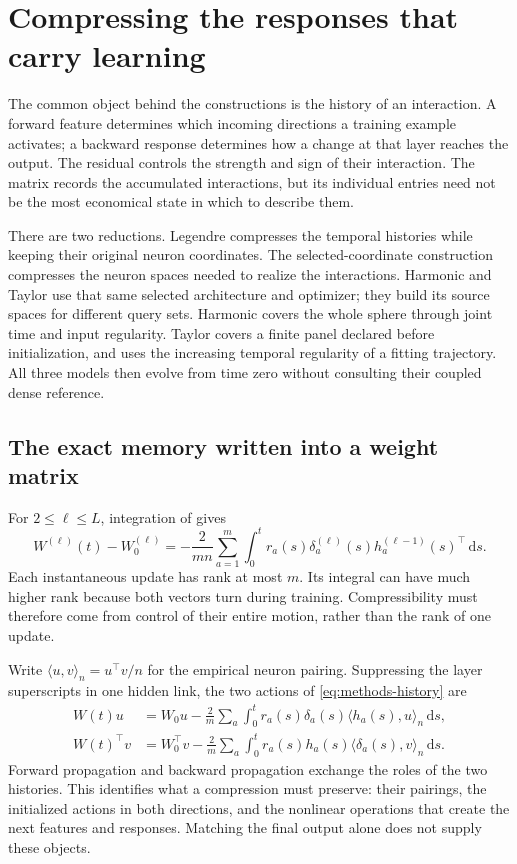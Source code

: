 \section{Compressing the responses that carry learning}
\label{sec:methods}

The common object behind the constructions is the history of an interaction.
A forward feature determines which incoming directions a training example
activates; a backward response determines how a change at that layer reaches
the output. The residual controls the strength and sign of their interaction.
The matrix records the accumulated interactions, but its individual entries
need not be the most economical state in which to describe them.

There are two reductions. Legendre compresses the temporal histories while
keeping their original neuron coordinates. The selected-coordinate
construction compresses the neuron spaces needed to realize the interactions.
Harmonic and Taylor use that same selected architecture and optimizer;
they build its source spaces for different query sets. Harmonic covers the
whole sphere through joint time and input regularity. Taylor covers a
finite panel declared before initialization, and uses the increasing temporal
regularity of a fitting trajectory. All three models then evolve from time
zero without consulting their coupled dense reference.

\subsection{The exact memory written into a weight matrix}
\label{sec:response-identity}

For $2\le\ell\le L$, integration of  gives
\begin{equation}
 W^{(\ell)}(t)-W_0^{(\ell)}=-\frac{2}{mn}\sum_{a=1}^m
 \int_0^t r_a(s)\delta_a^{(\ell)}(s)
 h_a^{(\ell-1)}(s)^\top\,\mathrm ds.
 \label{eq:methods-history}
\end{equation}
Each instantaneous update has rank at most $m$. Its integral can have much
higher rank because both vectors turn during training. Compressibility must
therefore come from control of their entire motion, rather than the rank of
one update.

Write $\langle u,v\rangle_n=u^\top v/n$ for the empirical neuron pairing.
Suppressing the layer superscripts in one hidden link, the two actions of
\eqref{eq:methods-history} are
\begin{equation}
 \begin{aligned}
 W(t)u&=W_0u-\frac2m\sum_a\int_0^t
 r_a(s)\delta_a(s)\langle h_a(s),u\rangle_n\,\mathrm ds,\\
 W(t)^\top v&=W_0^\top v-\frac2m\sum_a\int_0^t
 r_a(s)h_a(s)\langle\delta_a(s),v\rangle_n\,\mathrm ds.
 \end{aligned}
 \label{eq:methods-paired-actions}
\end{equation}
Forward propagation and backward propagation exchange the roles of the two
histories. This identifies what a compression must preserve: their pairings,
the initialized actions in both directions, and the nonlinear operations
that create the next features and responses. Matching the final output alone
does not supply these objects.

